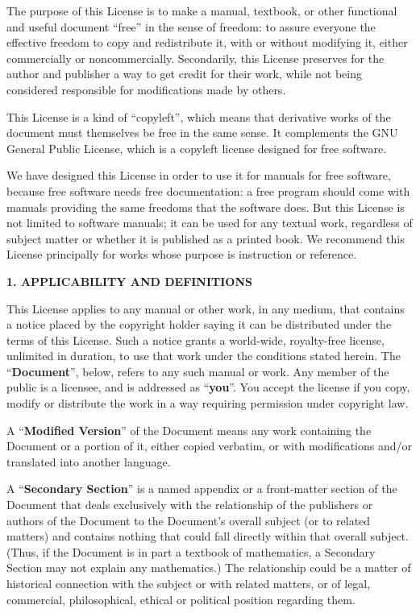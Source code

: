 \documentclass[a4paper,11pt,oneside]{book}
\begin{document}
The purpose of this License is to make a manual, textbook, or other
functional and useful document ``free'' in the sense of freedom: to
assure everyone the effective freedom to copy and redistribute it,
with or without modifying it, either commercially or noncommercially.
Secondarily, this License preserves for the author and publisher a way
to get credit for their work, while not being considered responsible
for modifications made by others.

This License is a kind of ``copyleft'', which means that derivative
works of the document must themselves be free in the same sense.  It
complements the GNU General Public License, which is a copyleft
license designed for free software.

We have designed this License in order to use it for manuals for free
software, because free software needs free documentation: a free
program should come with manuals providing the same freedoms that the
software does.  But this License is not limited to software manuals;
it can be used for any textual work, regardless of subject matter or
whether it is published as a printed book.  We recommend this License
principally for works whose purpose is instruction or reference.


\begin{center}
	{\Large\bf 1. APPLICABILITY AND DEFINITIONS\par}
\end{center}

This License applies to any manual or other work, in any medium, that
contains a notice placed by the copyright holder saying it can be
distributed under the terms of this License.  Such a notice grants a
world-wide, royalty-free license, unlimited in duration, to use that
work under the conditions stated herein.  The ``\textbf{Document}'', below,
refers to any such manual or work.  Any member of the public is a
licensee, and is addressed as ``\textbf{you}''.  You accept the license if you
copy, modify or distribute the work in a way requiring permission
under copyright law.

A ``\textbf{Modified Version}'' of the Document means any work containing the
Document or a portion of it, either copied verbatim, or with
modifications and/or translated into another language.

A ``\textbf{Secondary Section}'' is a named appendix or a front-matter section of
the Document that deals exclusively with the relationship of the
publishers or authors of the Document to the Document's overall subject
(or to related matters) and contains nothing that could fall directly
within that overall subject.  (Thus, if the Document is in part a
textbook of mathematics, a Secondary Section may not explain any
mathematics.)  The relationship could be a matter of historical
connection with the subject or with related matters, or of legal,
commercial, philosophical, ethical or political position regarding
them.
\end{document}
